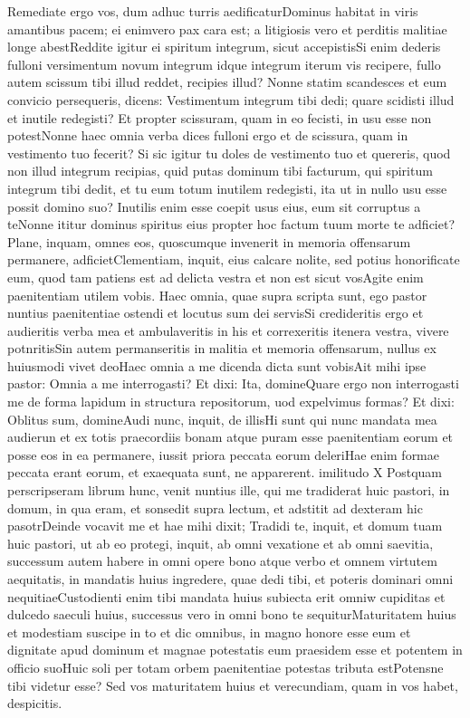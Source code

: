 Remediate ergo vos, dum adhuc turris aedificaturDominus habitat in viris amantibus pacem; ei enimvero pax cara est; a litigiosis vero et perditis malitiae longe abestReddite igitur ei spiritum integrum, sicut accepistisSi enim dederis fulloni versimentum novum integrum idque integrum iterum vis recipere, fullo autem scissum tibi illud reddet, recipies illud? Nonne statim scandesces et eum convicio persequeris, dicens: Vestimentum integrum tibi dedi; quare scidisti illud et inutile redegisti? Et propter scissuram, quam in eo fecisti, in usu esse non potestNonne haec omnia verba dices fulloni ergo et de scissura, quam in vestimento tuo fecerit? Si sic igitur tu doles de vestimento tuo et quereris, quod non illud integrum recipias, quid putas dominum tibi facturum, qui spiritum integrum tibi dedit, et tu eum totum inutilem redegisti, ita ut in nullo usu esse possit domino suo? Inutilis enim esse coepit usus eius, eum sit corruptus a teNonne ititur dominus spiritus eius propter hoc factum tuum morte te adficiet? Plane, inquam, omnes eos, quoscumque invenerit in memoria offensarum permanere, adficietClementiam, inquit, eius calcare nolite, sed potius honorificate eum, quod tam patiens est ad delicta vestra et non est sicut vosAgite enim paenitentiam utilem vobis.
Haec omnia, quae supra scripta sunt, ego pastor nuntius paenitentiae ostendi et locutus sum dei servisSi credideritis ergo et audieritis verba mea et ambulaveritis in his et correxeritis itenera vestra, vivere potnritisSin autem permanseritis in malitia et memoria offensarum, nullus ex huiusmodi vivet deoHaec omnia a me dicenda dicta sunt vobisAit mihi ipse pastor: Omnia a me interrogasti? Et dixi: Ita, domineQuare ergo non interrogasti me de forma lapidum in structura repositorum, uod expelvimus formas? Et dixi: Oblitus sum, domineAudi nunc, inquit, de illisHi sunt qui nunc mandata mea audierun et ex totis praecordiis bonam atque puram esse paenitentiam eorum et posse eos in ea permanere, iussit priora peccata eorum deleriHae enim formae peccata erant eorum, et exaequata sunt, ne apparerent.
imilitudo X
Postquam perscripseram librum hunc, venit nuntius ille, qui me tradiderat huic pastori, in domum, in qua eram, et sonsedit supra lectum, et adstitit ad dexteram hic pasotrDeinde vocavit me et hae mihi dixit; Tradidi te, inquit, et domum tuam huic pastori, ut ab eo protegi, inquit, ab omni vexatione et ab omni saevitia, successum autem habere in omni opere bono atque verbo et omnem virtutem aequitatis, in mandatis huius ingredere, quae dedi tibi, et poteris dominari omni nequitiaeCustodienti enim tibi mandata huius subiecta erit omniw cupiditas et dulcedo saeculi huius, successus vero in omni bono te sequiturMaturitatem huius et modestiam suscipe in to et dic omnibus, in magno honore esse eum et dignitate apud dominum et magnae potestatis eum praesidem esse et potentem in officio suoHuic soli per totam orbem paenitentiae potestas tributa estPotensne tibi videtur esse? Sed vos maturitatem huius et verecundiam, quam in vos habet, despicitis.

